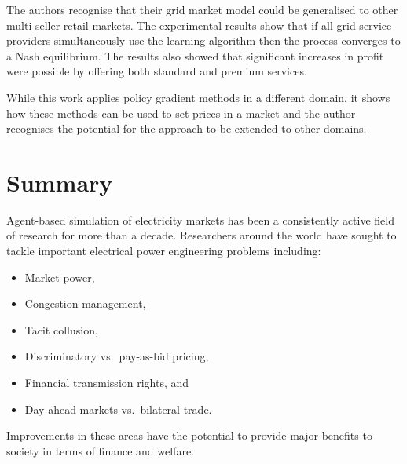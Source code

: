 The authors recognise that their grid market model could be generalised to
other multi-seller retail markets.  The experimental results show that if
all grid service providers simultaneously use the learning algorithm then the
process converges to a Nash equilibrium.  The results also showed that
significant increases in profit were possible by offering both standard and
premium services.

While this work applies policy gradient methods in a different domain, it shows
how these methods can be used to set prices in a market and the author
recognises the potential for the approach to be extended to other domains.



\section{Summary}
Agent-based simulation of electricity markets has been a consistently active
field of research for more than a decade.  Researchers around the world have
sought to tackle important electrical power engineering problems including:
\begin{itemize}
  \item Market power,
  \item Congestion management,
  \item Tacit collusion,
  \item Discriminatory vs.~pay-as-bid pricing,
  \item Financial transmission rights, and
  \item Day ahead markets vs.~bilateral trade.
\end{itemize}
Improvements in these areas have the potential to provide major benefits to
society in terms of finance and welfare.


